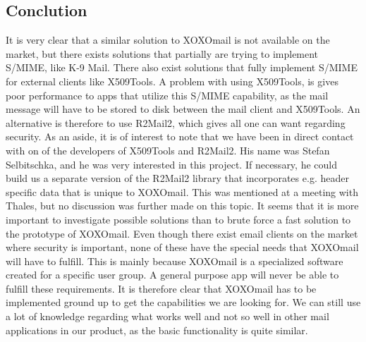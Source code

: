 \subsection{Conclution}
It is very clear that a similar solution to XOXOmail is not available on the market, but there exists solutions that partially are trying to implement S/MIME, like K-9 Mail. There also exist solutions that fully implement S/MIME for external clients like X509Tools. A problem with using X509Tools, is gives poor performance to apps that utilize this S/MIME capability, as the mail message will have to be stored to disk between the mail client and X509Tools. An alternative is therefore to use R2Mail2, which gives all one can want regarding security.
\newline
\newline
As an aside, it is of interest to note that we have been in direct contact with on of the developers of X509Tools and R2Mail2. His name was Stefan Selbitschka, and he was very interested in this project. If necessary, he could build us a separate version of the R2Mail2 library that incorporates e.g. header specific data that is unique to XOXOmail. This was mentioned at a meeting with Thales, but no discussion was further made on this topic. It seems that it is more important to investigate possible solutions than to brute force a fast solution to the prototype of XOXOmail.
\newline
\newline
Even though there exist email clients on the market where security is important, none of these have the special needs that XOXOmail will have to fulfill. This is mainly because XOXOmail is a specialized software created for a specific user group. A general purpose app will never be able to fulfill these requirements. It is therefore clear that XOXOmail has to be implemented ground up to get the capabilities we are looking for. We can still use a lot of knowledge regarding what works well and not so well in other mail applications in our product, as the basic functionality is quite similar.